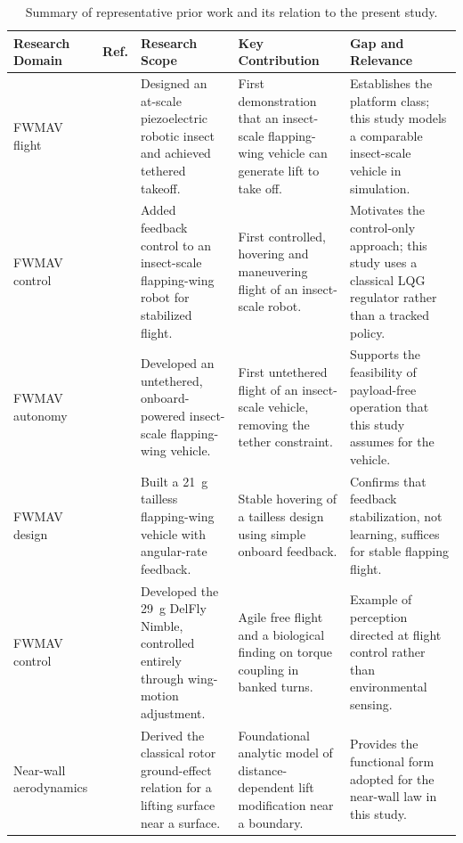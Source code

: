 \documentclass[final,5p,times]{elsarticle}
\begin{document}
\begin{table}[t]
\centering
\caption{Summary of representative prior work and its relation to the present study.}
\label{tab:litreview}
\footnotesize
\renewcommand{\arraystretch}{1.3}
\begin{tabular}{@{}p{2.0cm} p{1.1cm} p{4.4cm} p{4.4cm} p{4.4cm}@{}}
\toprule
\textbf{Research Domain} & \textbf{Ref.} & \textbf{Research Scope} & \textbf{Key Contribution} & \textbf{Gap and Relevance} \\
\midrule
FWMAV flight &
\cite{wood2008first} &
Designed an at-scale piezoelectric robotic insect and achieved tethered takeoff. &
First demonstration that an insect-scale flapping-wing vehicle can generate lift to take off. &
Establishes the platform class; this study models a comparable insect-scale vehicle in simulation. \\

FWMAV control &
\cite{ma2013controlled} &
Added feedback control to an insect-scale flapping-wing robot for stabilized flight. &
First controlled, hovering and maneuvering flight of an insect-scale robot. &
Motivates the control-only approach; this study uses a classical LQG regulator rather than a tracked policy. \\

FWMAV autonomy &
\cite{jafferis2019untethered} &
Developed an untethered, onboard-powered insect-scale flapping-wing vehicle. &
First untethered flight of an insect-scale vehicle, removing the tether constraint. &
Supports the feasibility of payload-free operation that this study assumes for the vehicle. \\

FWMAV design &
\cite{phan2017design} &
Built a 21~g tailless flapping-wing vehicle with angular-rate feedback. &
Stable hovering of a tailless design using simple onboard feedback. &
Confirms that feedback stabilization, not learning, suffices for stable flapping flight. \\

FWMAV control &
\cite{karasek2018tailless} &
Developed the 29~g DelFly Nimble, controlled entirely through wing-motion adjustment. &
Agile free flight and a biological finding on torque coupling in banked turns. &
Example of perception directed at flight control rather than environmental sensing. \\

Near-wall aerodynamics &
\cite{cheeseman1959effect} &
Derived the classical rotor ground-effect relation for a lifting surface near a surface. &
Foundational analytic model of distance-dependent lift modification near a boundary. &
Provides the functional form adopted for the near-wall law in this study. \\


\end{tabular}
\end{table}
\end{document}

